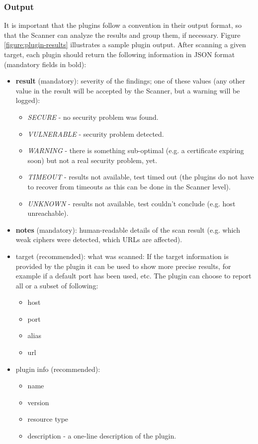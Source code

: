 \subsubsection{Output}
It is important that the plugins follow a convention in their output format, so that the Scanner can analyze the results and group them, if necessary. Figure \ref{figure:plugin-results} illustrates a sample plugin output. After scanning a given target, each plugin should return the following information in JSON format (mandatory fields in bold): 
\begin{itemize}


   \item \textbf{result} (mandatory): severity of the findings; one of these values (any other value in the result will be accepted by the Scanner, but a warning will be logged):
    \begin{itemize}
    

        \item \textit{SECURE} - no security problem was found.
        \item  \textit{VULNERABLE} - security problem detected.
        \item  \textit{WARNING} - there is something sub-optimal (e.g. a certificate expiring soon) but not a real security problem, yet.
        \item  \textit{TIMEOUT} - results not available, test timed out (the plugins do not have to recover from timeouts as this can be done in the Scanner level).
        \item  \textit{UNKNOWN} - results not available, test couldn't conclude (e.g. host unreachable).
      
            \end{itemize}
\item      \textbf{notes} (mandatory): human-readable details of the scan result (e.g. which weak ciphers were detected, which URLs are affected).
\item      target (recommended): what was scanned: If the target information is provided by the plugin it can be used to show more precise results, for example if a default port has been used, etc. The plugin can choose to report all or a subset of following:
\begin{itemize}


\item        host
\item    port
\item    alias
\item    url 
\end{itemize}
\item    plugin info (recommended):
\begin{itemize}
\item        name
\item        version
\item    resource type
\item    description - a one-line description of the plugin. 
\end{itemize}
\end{itemize}



